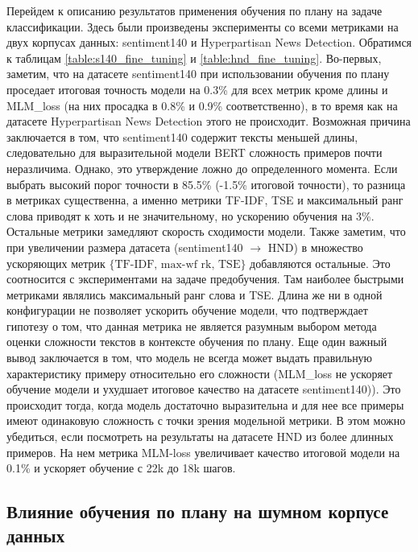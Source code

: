 \documentclass{spbau-diploma}
\begin{document}
Перейдем к описанию результатов применения обучения по плану на задаче классификации. Здесь были произведены эксперименты со всеми метриками на двух корпусах данных: sentiment140 и Hyperpartisan News Detection. Обратимся к таблицам \ref{table:s140_fine_tuning} и \ref{table:hnd_fine_tuning}. Во-первых, заметим, что на датасете sentiment140 при использовании обучения по плану проседает итоговая точность модели на 0.3\% для всех метрик кроме длины и MLM\_loss (на них просадка в 0.8\% и 0.9\% соответственно), в то время как на датасете Hyperpartisan News Detection этого не происходит. Возможная причина заключается в том, что sentiment140 содержит тексты меньшей длины, следовательно для выразительной модели BERT сложность примеров почти неразличима. Однако, это утверждение ложно до определенного момента. Если выбрать высокий порог точности в 85.5\% (-1.5\% итоговой точности), то разница в метриках существенна, а именно метрики TF-IDF, TSE и максимальный ранг слова приводят к хоть и не значительному, но ускорению обучения на 3\%. Остальные метрики замедляют скорость сходимости модели. Также заметим, что при увеличении размера датасета (sentiment140 $\rightarrow$ HND) в множество ускоряющих метрик $\{\text{TF-IDF, max-wf rk, TSE}\}$ добавляются остальные. Это соотносится с экспериментами на задаче предобучения. Там наиболее быстрыми метриками являлись максимальный ранг слова и TSE. Длина же ни в одной конфигурации не позволяет ускорить обучение модели, что подтверждает гипотезу о том, что данная метрика не является разумным выбором метода оценки сложности текстов в контексте обучения по плану. Еще один важный вывод заключается в том, что модель не всегда может выдать правильную характеристику примеру относительно его сложности (MLM\_loss не ускоряет обучение модели и ухудшает итоговое качество на датасете sentiment140)). Это происходит тогда, когда модель достаточно выразительна и для нее все примеры имеют одинаковую сложность с точки зрения модельной метрики. В этом можно убедиться, если посмотреть на результаты на датасете HND из более длинных примеров. На нем метрика MLM-loss увеличивает качество итоговой модели на 0.1\% и ускоряет обучение с 22k до 18k шагов.

\pagebreak
\subsection{Влияние обучения по плану на шумном корпусе данных}
\ 
\end{document}
